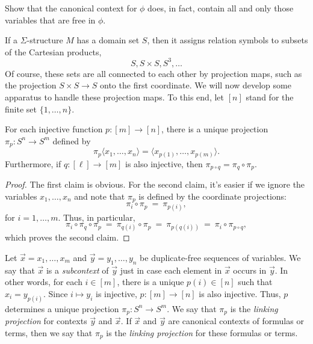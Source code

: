 \begin{exercise} Show that the canonical context for $\phi$ does, in
  fact, contain all and only those variables that are free in
  $\phi$. \end{exercise}

If a $\Sigma$-structure $M$ has a domain set $S$, then it assigns
relation symbols to subsets of the Cartesian products,
\[ S,S\times S,S^3,\dots \] Of course, these sets are all connected to
each other by projection maps, such as the projection $S\times S\to S$
onto the first coordinate.  We will now develop some apparatus to
handle these projection maps.  To this end, let $[n]$ stand for the
finite set $\{ 1,\dots ,n\}$.

\begin{lemma} For each injective function $p:[m]\to [n]$, there is a
  unique projection $\pi _p:S^n\to S^m$ defined by
  \[ \pi _p\langle x_1,\dots ,x_n\rangle = \langle x_{p(1)},\dots
    ,x_{p(m)}\rangle . \] Furthermore, if $q:[\ell ]\to [m]$ is also
  injective, then $\pi _{p\circ q}=\pi _q\circ \pi _p$.  \end{lemma}

\begin{proof} The first claim is obvious.  For the second claim, it's
  easier if we ignore the variables $x_1,\dots ,x_n$ and note that
  $\pi _p$ is defined by the coordinate projections:
  \[ \pi _i\circ \pi _p \: = \: \pi _{p(i)} ,\] for $i=1,\dots ,m$.
  Thus, in particular,
    \[
      \pi _i\circ \pi _q\circ \pi _p \: = \: \pi _{q(i)}\circ \pi _p
      \: = \: \pi _{p(q(i))} \: = \: \pi _i\circ \pi _{p\circ q} ,\]
    which proves the second claim.
  \end{proof}

  \begin{defn} Let $\vec{x}=x_1,\dots ,x_m$ and
    $\vec{y}=y_1,\dots ,y_n$ be duplicate-free sequences of variables.
    We say that $\vec{x}$ is a \emph{subcontext} of $\vec{y}$ just in
    case each element in $\vec{x}$ occurs in $\vec{y}$.  In other
    words, for each $i\in [m]$, there is a unique $p(i)\in [n]$ such
    that $x_i=y_{p(i)}$.  Since $i\mapsto y_i$ is injective,
    $p:[m]\to [n]$ is also injective.  Thus, $p$ determines a unique
    projection $\pi _p:S^n\to S^m$.  We say that $\pi _p$ is the
    \emph{linking projection} for contexts $\vec{y}$ and $\vec{x}$.
    If $\vec{x}$ and $\vec{y}$ are canonical contexts of formulas or
    terms, then we say that $\pi _p$ is the \emph{linking projection}
    for these formulas or terms.
  \end{defn}

